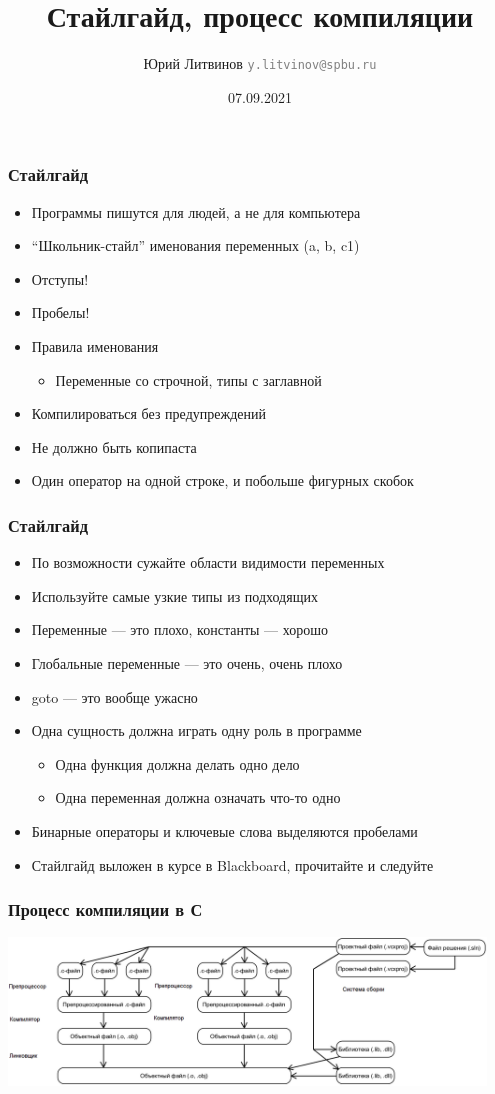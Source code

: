 \documentclass[xetex,mathserif,serif]{beamer}
\title{Стайлгайд, процесс компиляции}
\author[Юрий Литвинов]{Юрий Литвинов \newline \textcolor{gray}{\small\texttt{y.litvinov@spbu.ru}}}
\date{07.09.2021}
\begin{document}
    
    \frame{\titlepage}
    
    \begin{frame}
        \frametitle{Стайлгайд}
        \begin{itemize}
            \item Программы пишутся для людей, а не для компьютера
            \item ``Школьник-стайл'' именования переменных (a, b, c1)
            \item Отступы!
            \item Пробелы!
            \item Правила именования
            \begin{itemize}
                \item Переменные со строчной, типы с заглавной
            \end{itemize}
            \item Компилироваться без предупреждений
            \item Не должно быть копипаста
            \item Один оператор на одной строке, и побольше фигурных скобок
        \end{itemize}
    \end{frame}

    \begin{frame}
        \frametitle{Стайлгайд}
        \begin{itemize}
            \item По возможности сужайте области видимости переменных
            \item Используйте самые узкие типы из подходящих
            \item Переменные --- это плохо, константы --- хорошо
            \item Глобальные переменные --- это очень, очень плохо
            \item goto --- это вообще ужасно
            \item Одна сущность должна играть одну роль в программе
            \begin{itemize}
                \item Одна функция должна делать одно дело
                \item Одна переменная должна означать что-то одно
            \end{itemize}
            \item Бинарные операторы и ключевые слова выделяются пробелами
            \item Стайлгайд выложен в курсе в Blackboard, прочитайте и следуйте
        \end{itemize}
    \end{frame}

    \begin{frame}
        \frametitle{Процесс компиляции в С}
        \begin{center}
            \includegraphics[width=0.95\textwidth]{compilation.png}
        \end{center}
    \end{frame}
\end{document}
